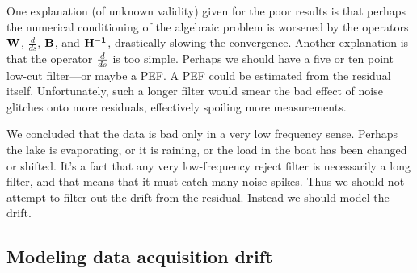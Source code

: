 \par
One explanation (of unknown validity)
given for the poor results is that perhaps
the numerical conditioning
of the algebraic problem is worsened by the operators $\bold W$, 
$\frac{d}{ds}$, $\bold B$, and $\bold {H^{-1}}$,
drastically slowing the convergence.
Another explanation is that the operator $d\over ds$ is too simple.
Perhaps we should have a five or ten point low-cut filter---or maybe a PEF.
A PEF could be estimated from the residual itself.
Unfortunately, such a longer filter would smear the bad effect
of noise glitches onto more residuals,
effectively spoiling more measurements.

\par
We concluded that the data is bad only in a very low frequency sense.
Perhaps the lake is evaporating, or it is raining,
or the load in the boat has been changed or shifted.
It's a fact that any very low-frequency reject filter
is necessarily a long filter,
and that means that it must catch many noise spikes.
Thus we should not attempt to filter out the drift from the residual.
Instead we should model the drift.

\par
{}

\subsection{Modeling data acquisition drift}

